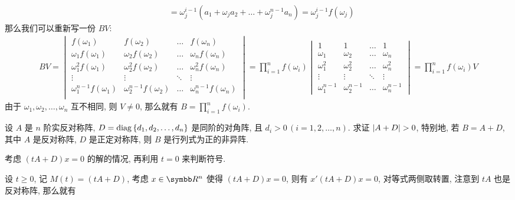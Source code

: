 \begin{exercise}[series=exer]
\begin{answer}
\begin{align*}
          & = \omega_{j}^{i-1}(a_{1} + \omega_{j}a_{2} + \dots + \omega_{j}^{n-1}a_{n}) = \omega_{j}^{i-1}f(\omega_{j})
      \end{align*}
      那么我们可以重新写一份 $ BV $:
      \begin{align*}
          BV = \begin{vmatrix}
              f(\omega_{1}) & f(\omega_{2}) & \dots & f(\omega_{n})\\
              \omega_{1}f(\omega_{1}) & \omega_{2}f(\omega_{2}) & \dots & \omega_{n}f(\omega_{n})\\
              \omega_{1}^{2}f(\omega_{1}) & \omega_{2}^{2}f(\omega_{2}) & \dots & \omega_{n}^{2}f(\omega_{n})\\
              \vdots & \vdots & \ddots & \vdots\\
              \omega_{1}^{n-1}f(\omega_{1}) & \omega_{2}^{n-1}f(\omega_{2}) & \dots & \omega_{n}^{n-1}f(\omega_{n})\\
          \end{vmatrix} = \prod_{i = 1}^{n}f(\omega_{i})
          \begin{vmatrix}
              1 & 1 & \dots & 1\\
              \omega_{1} & \omega_{2} & \dots & \omega_{n}\\
              \omega_{1}^{2} & \omega_{2}^{2} & \dots & \omega_{n}^{2}\\
              \vdots & \vdots & \ddots & \vdots\\
              \omega_{1}^{n-1} & \omega_{2}^{n-1} & \dots & \omega_{n}^{n-1}
          \end{vmatrix}= \prod_{i = 1}^{n}f(\omega_{i})V
      \end{align*}
      由于 $ \omega_{1}, \omega_{2}, \dots, \omega_{n} $ 互不相同, 则 $ V \ne 0 $, 那么就有 $ B = \prod_{i = 1}^{n}f(\omega_{i}) $.
  \end{answer}
  \sitem\label{item:反称加对角} 设 $ A $ 是 $ n $ 阶实反对称阵, $ D = \operatorname{diag}\qty{d_{1}, d_{2}, \dots, d_{n}} $ 是同阶的对角阵, 且 $ d_{i} > 0\,(i = 1, 2, \dots, n) $. 求证 $ \abs{A + D} > 0 $, 特别地, 若 $ B = A + D $, 其中 $ A $ 是反对称阵, $ D $ 是正定对称阵, 则 $ B $ 是行列式为正的非异阵.
  \begin{hint}
      考虑 $ (tA + D)x = 0 $ 的解的情况, 再利用 $ t = 0 $ 来判断符号.
  \end{hint}
  \begin{answer}
      设 $ t \ge 0 $, 记 $ M(t) = (tA + D) $, 考虑 $ x \in \R^{n} $ 使得 $ (tA + D)x = 0 $, 则有 $ x'(tA + D)x = 0 $, 对等式两侧取转置, 注意到 $ tA $ 也是反对称阵, 那么就有

\end{answer}
\end{exercise}
